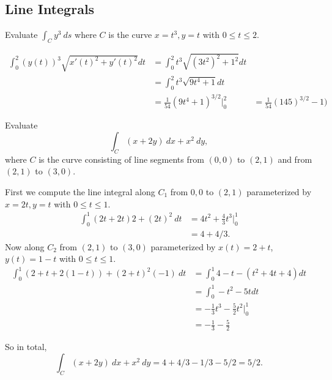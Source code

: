 \documentclass[12pt]{exam}
\begin{document}
\begin{questions}
\newpage

 \subsection*{Line Integrals}

 \question Evaluate \(\int_{C}y^3~ds\) where \(C\) is the curve \(x=t^3,y=t\) with \(0\le t \le 2\).
 \ifprintanswers
        \begin{solution}
            \begin{align*} 
                \int_0^2 (y(t))^3\sqrt{x'(t)^2+y'(t)^2}dt & = \int_{0}^2 t^3\sqrt{(3t^2)^2+1^2}dt\\
                    & = \int_0^2 t^3\sqrt{9t^4+1}dt\\
                    & = \frac{1}{54}(9t^4+1)^{3/2}|_0^2
                    & = \frac{1}{54}(145)^{3/2}-1)
            \end{align*}
        \end{solution}
    \else
        \vfill
    \fi

 \question Evaluate 
 \[
    \int_{C}(x+2y)~dx+x^2~dy,
 \] where \(C\) is the curve consisting of line segments from \((0,0)\) to \((2,1)\) and from \((2,1)\) to \((3,0)\).
 \ifprintanswers
        \begin{solution}
        First we compute the line integral along \(C_1\) from \(0,0\) to \((2,1)\) parameterized by \(x=2t,y=t\) with \(0\le t \le 1\).
            \begin{align*}
                \int_{0}^1(2t+2t)2+(2t)^2 ~dt & = 4t^2+\frac{4}{3}t^3|_0^1\\
                    & = 4+4/3.
            \end{align*}
            Now along \(C_2\) from \((2,1)\) to \((3,0)\) parameterized by \(x(t)=2+t\), \(y(t)=1-t\) with \(0\le  t\le 1\).
            \begin{align*}
                \int_{0}^1 (2+t+2(1-t))+(2+t)^2(-1)~dt & = \int_0^1 4-t-(t^2+4t+4) dt\\
                    & = \int_0^1 -t^2-5t dt\\
                    & = -\frac{1}{3}t^3-\frac{5}{2}t^2|_0^1\\
                    & = -\frac{1}{3}-\frac{5}{2}
            \end{align*}

            So in total, 
            \[
                \int_{C}(x+2y)~dx+x^2~dy = 4+4/3-1/3-5/2 = 5/2.
            \] 
        \end{solution}
    \else
        \vfill
        \newpage
    \fi


\end{questions}
\end{document}
